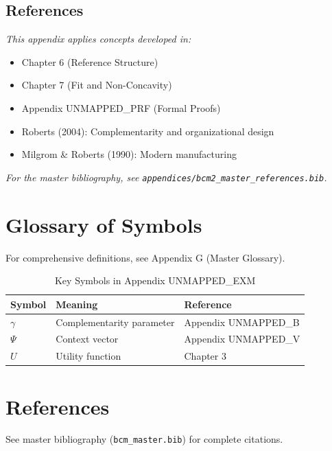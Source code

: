 
\subsection{References}

\noindent\textit{This appendix applies concepts developed in:}

\begin{itemize}[nosep]
    \item Chapter 6 (Reference Structure)
    \item Chapter 7 (Fit and Non-Concavity)
    \item Appendix UNMAPPED_PRF (Formal Proofs)
    \item Roberts (2004): Complementarity and organizational design
    \item Milgrom \& Roberts (1990): Modern manufacturing
\end{itemize}

\noindent\textit{For the master bibliography, see \texttt{appendices/bcm2\_master\_references.bib}.}



\nocite{bcm_master}



\section{Glossary of Symbols}
\label{sec:exm-glossary}

For comprehensive definitions, see Appendix G (Master Glossary).

\begin{table}[htbp]
\centering
\caption{Key Symbols in Appendix UNMAPPED_EXM}
\begin{tabular}{lll}
\toprule
\textbf{Symbol} & \textbf{Meaning} & \textbf{Reference} \\
\midrule
$\gamma$ & Complementarity parameter & Appendix UNMAPPED_B \\
$\Psi$ & Context vector & Appendix UNMAPPED_V \\
$U$ & Utility function & Chapter 3 \\
\bottomrule
\end{tabular}
\end{table}


\section{References}
\label{sec:exm-references}

See master bibliography (\texttt{bcm\_master.bib}) for complete citations.

\nocite{bcm_master}


